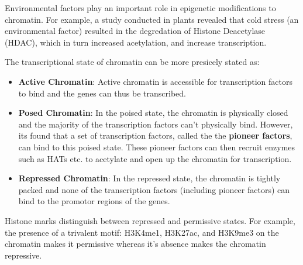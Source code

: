 \documentclass[letterpaper,12pt]{article}
\begin{document}
Environmental factors play an important role in epigenetic modifications to chromatin. For example, a study conducted in plants revealed that cold stress (an environmental factor) resulted in the degredation of Histone Deacetylase (HDAC), which in turn increased acetylation, and increase transcription\cite{Park_Lim_2018}.\vspace{1.5cm}

The transcriptional state of chromatin can be more presicely stated as:
\begin{itemize}
	\item \textbf{Active Chromatin}: Active chromatin is accessible for transcription factors to bind and the genes can thus be transcribed.
	\item \textbf{Posed Chromatin}: In the poised state, the chromatin is physically closed and the majority of the transcription factors can't physically bind. However, its found that a set of transcription factors, called the the \textbf{pioneer factors}, can bind to this poised state. These pioneer factors can then recruit enzymes such as HATs etc. to acetylate and open up the chromatin for transcription.
	\item \textbf{Repressed Chromatin}: In the repressed state, the chromatin is tightly packed and none of the transcription factors (including pioneer factors) can bind to the promotor regions of the genes.
\end{itemize}

Histone marks distinguish between repressed and permissive states. For example, the presence of a trivalent motif: H3K4me1, H3K27ac, and H3K9me3 on the chromatin makes it permissive whereas it's absence makes the chromatin repressive.\vspace{0.5cm}

\setlength{\fboxsep}{10pt}
\noindent{}
\end{document}
